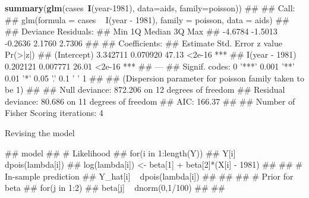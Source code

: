 \documentclass[11pt,ignorenonframetext,]{beamer}
\newenvironment{Shaded}{}{}
\newcommand{\KeywordTok}[1]{\textcolor[rgb]{0.00,0.44,0.13}{\textbf{{#1}}}}
\newcommand{\DataTypeTok}[1]{\textcolor[rgb]{0.56,0.13,0.00}{{#1}}}
\newcommand{\DecValTok}[1]{\textcolor[rgb]{0.25,0.63,0.44}{{#1}}}
\newcommand{\NormalTok}[1]{{#1}}
\let\oldShaded\Shaded
\let\endoldShaded\endShaded
\renewenvironment{Shaded}{\footnotesize\begin{spacing}{0.9}\oldShaded}{\endoldShaded\end{spacing}}
\let\oldverbatim\verbatim
\let\endoldverbatim\endverbatim
\renewenvironment{verbatim}{\footnotesize\begin{spacing}{0.9}\oldverbatim}{\endoldverbatim\end{spacing}}
\begin{document}
\begin{frame}[fragile]{}

\begin{Shaded}
\begin{Highlighting}[]
\KeywordTok{summary}\NormalTok{(}\KeywordTok{glm}\NormalTok{(cases~}\KeywordTok{I}\NormalTok{(year}\DecValTok{-1981}\NormalTok{), }\DataTypeTok{data=}\NormalTok{aids, }\DataTypeTok{family=}\NormalTok{poisson))}
\NormalTok{## }
\NormalTok{## Call:}
\NormalTok{## glm(formula = cases ~ I(year - 1981), family = poisson, data = aids)}
\NormalTok{## }
\NormalTok{## Deviance Residuals: }
\NormalTok{##     Min       1Q   Median       3Q      Max  }
\NormalTok{## -4.6784  -1.5013  -0.2636   2.1760   2.7306  }
\NormalTok{## }
\NormalTok{## Coefficients:}
\NormalTok{##                Estimate Std. Error z value Pr(>|z|)    }
\NormalTok{## (Intercept)    3.342711   0.070920   47.13   <2e-16 ***}
\NormalTok{## I(year - 1981) 0.202121   0.007771   26.01   <2e-16 ***}
\NormalTok{## ---}
\NormalTok{## Signif. codes:  0 '***' 0.001 '**' 0.01 '*' 0.05 '.' 0.1 ' ' 1}
\NormalTok{## }
\NormalTok{## (Dispersion parameter for poisson family taken to be 1)}
\NormalTok{## }
\NormalTok{##     Null deviance: 872.206  on 12  degrees of freedom}
\NormalTok{## Residual deviance:  80.686  on 11  degrees of freedom}
\NormalTok{## AIC: 166.37}
\NormalTok{## }
\NormalTok{## Number of Fisher Scoring iterations: 4}
\end{Highlighting}
\end{Shaded}

\end{frame}

\begin{frame}[fragile]{Revising the model}

\begin{verbatim}
## model{
##   # Likelihood
##   for(i in 1:length(Y)){
##     Y[i] ~ dpois(lambda[i])
##     log(lambda[i]) <- beta[1] + beta[2]*(X[i] - 1981)
##     
##     # In-sample prediction
##     Y_hat[i] ~ dpois(lambda[i])
##   }
## 
##   # Prior for beta
##   for(j in 1:2){
##     beta[j] ~ dnorm(0,1/100)
##   }
## }
\end{verbatim}

\end{frame}
\end{document}
